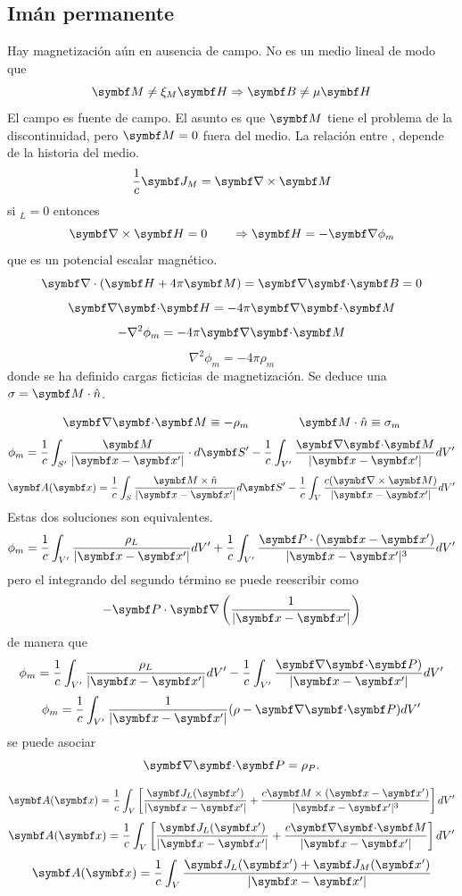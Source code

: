 \documentclass[10pt,oneside]{CBFT_book}
\begin{document}
\subsection{Imán permanente}

Hay magnetización  aún en ausencia de campo. No es un medio lineal de modo que
\[
	\vb{M}	 \neq \xi_M \vb{H} \Rightarrow \vb{B} \neq \mu \vb{H}
\]
El campo  es fuente de campo. El asunto es que $\vb{M}$ tiene el problema de
la discontinuidad, pero $ \vb{M} = 0 $ fuera del medio.
La relación entre , depende de la historia del medio.
\[
	\frac{1}{c}\vb{J}_M = \rotorm{M}
\]
si $_L=0$ entonces 
\[
	\rotorm{H} = 0 \qquad \Rightarrow \vb{H} = -\Nabla\phi_m
\]
que es un potencial escalar magnético.
\[
	\Nabla\cdot( \vb{H} + 4\pi\vb{M} ) = \divem{B} = 0
\]
\[
	\divem{H} = -4\pi\divem{M}
\]
\[
	-\nabla^2 \phi_m = -4\pi\divem{M}
\]
\[
	\nabla^2 \phi_m = -4\pi\rho_m
\]
donde se ha definido cargas ficticias de magnetización.
Se deduce una $ \sigma = \vb{M} \cdot \hat{n} $.

\[
	\divem{M} \equiv -\rho_m \qquad \qquad \vb{M}\cdot\hat{n} \equiv \sigma_m
\]
\[
	\phi_m = \frac{1}{c} \int_{S'} \frac{\vb{M}}{|\vb{x}-\vb{x}'|} \cdot d\vb{S}' -
		\frac{1}{c} \int_{V'} \frac{\divem{M}}{|\vb{x}-\vb{x}'|} dV' 
\]
\[
	\vb{A}( \vb{x}) = \frac{1}{c} \int_S \frac{ \vb{M}\times\hat{n} }{|\vb{x}-\vb{x}'|} d\vb{S}' - 
		\frac{1}{c} \int_V \frac{ c(\rotorm{M}) }{|\vb{x}-\vb{x}'|}  dV'
\]
Estas dos soluciones son equivalentes.
\[
	\phi_m = \frac{1}{c} \int_{V'} \frac{\rho_L}{|\vb{x}-\vb{x}'|}  dV' +
		\frac{1}{c} \int_{V'} \frac{ \vb{P}\cdot(\vb{x}-\vb{x}')}{|\vb{x}-\vb{x}'|^3} dV' 
\]
pero el integrando del segundo término se puede reescribir como 
\[
	-\vb{P}\cdot\Nabla\left(\frac{1}{|\vb{x}-\vb{x}'|}\right)
\]
de manera que 
\[
	\phi_m = \frac{1}{c} \int_{V'} \frac{\rho_L}{|\vb{x}-\vb{x}'|}  dV' -
		\frac{1}{c} \int_{V'} \frac{ \divem{P}) }{|\vb{x}-\vb{x}'|} dV' 
\]
\[
	\phi_m = \frac{1}{c} \int_{V'} \frac{1}{|\vb{x}-\vb{x}'|}( \rho - \divem{P} )  dV'
\]
se puede asociar
\[
	\divem{P} = \rho_P.
\]

\[
	\vb{A}( \vb{x}) = \frac{1}{c} \int_V \left[ \frac{ \vb{J}_L(\vb{x}') }{|\vb{x}-\vb{x}'|} +
		\frac{ c \vb{M} \times (\vb{x}-\vb{x}') }{|\vb{x}-\vb{x}'|^3} \right] dV'
\]
\[
	\vb{A}( \vb{x}) = \frac{1}{c} \int_V \left[ \frac{ \vb{J}_L(\vb{x}') }{|\vb{x}-\vb{x}'|} +
		\frac{ c \divem{M} }{|\vb{x}-\vb{x}'|} \right] dV'
\]
\[
	\vb{A}( \vb{x}) = \frac{1}{c} \int_V \frac{ \vb{J}_L(\vb{x}') + \vb{J}_M(\vb{x}' ) }{|\vb{x}-\vb{x}'|}	
\]
\end{document}
